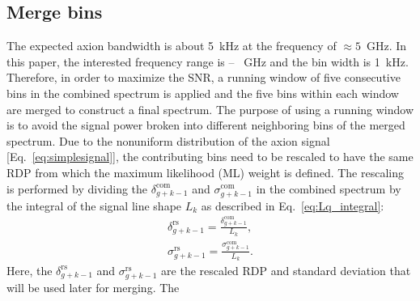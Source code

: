 
\subsection{Merge bins}
\label{sec:merge}

The expected axion bandwidth is about 5~kHz at the frequency of $\approx5$~GHz. 
In this paper, the interested frequency range is \flo -- \fhi~GHz and the bin 
width is 1~kHz. Therefore, in order to maximize the SNR, a running window of 
five consecutive bins in the combined spectrum is applied and the five bins 
within each window are merged to construct a final spectrum.
The purpose of using a running window is to avoid the signal power broken 
into different neighboring bins of the merged spectrum. 
Due to the nonuniform distribution of the axion signal 
[Eq.~\eqref{eq:simplesignal}],
the contributing bins need to be rescaled to have the same RDP from which the 
maximum likelihood (ML)
weight is defined. The rescaling is performed by dividing the 
$\delta^\text{com}_{g+k-1}$ and $\sigma^\text{com}_{g+k-1}$ in the combined 
spectrum by the integral of the signal line shape $L_{k}$ as described in 
Eq.~\eqref{eq:Lq_integral}: 
\begin{equation}
  \label{eq:rescaled_delta_sigma_com}
  \begin{split}
  \delta^\text{rs}_{g+k-1} = \frac{\delta^\text{com}_{g+k-1}}{L_{k}},\\
  \sigma^\text{rs}_{g+k-1} = \frac{\sigma^\text{com}_{g+k-1}}{L_{k}}.
  \end{split}
\end{equation}
Here, the $\delta^\text{rs}_{g+k-1}$ and $\sigma^\text{rs}_{g+k-1}$ are the 
rescaled RDP and standard deviation that will be used later for merging. The 
